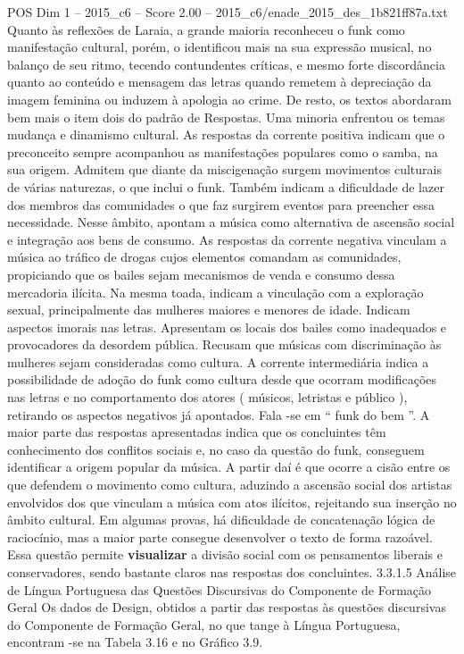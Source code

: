 \begin{textsample}{POS Dim 1 – 2015\_c6 – Score 2.00 – 2015\_c6/enade\_2015\_des\_1b821ff87a.txt}
Quanto às reflexões de Laraia, a grande maioria reconheceu o funk como manifestação cultural, porém, o identificou mais na sua expressão musical, no balanço de seu ritmo, tecendo contundentes críticas, e mesmo forte discordância quanto ao conteúdo e mensagem das letras quando remetem à depreciação da imagem feminina ou induzem à apologia ao crime.
De resto, os textos abordaram bem mais o item dois do padrão de Respostas.
Uma minoria enfrentou os temas mudança e dinamismo cultural.
As respostas da corrente positiva indicam que o preconceito sempre acompanhou as manifestações populares como o samba, na sua origem.
Admitem que diante da miscigenação surgem movimentos culturais de várias naturezas, o que inclui o funk.
Também indicam a dificuldade de lazer dos membros das comunidades o que faz surgirem eventos para preencher essa necessidade.
Nesse âmbito, apontam a música como alternativa de ascensão social e integração aos bens de consumo.
As respostas da corrente negativa vinculam a música ao tráfico de drogas cujos elementos comandam as comunidades, propiciando que os bailes sejam mecanismos de venda e consumo dessa mercadoria ilícita.
Na mesma toada, indicam a vinculação com a exploração sexual, principalmente das mulheres maiores e menores de idade.
Indicam aspectos imorais nas letras.
Apresentam os locais dos bailes como inadequados e provocadores da desordem pública.
Recusam que músicas com discriminação às mulheres sejam consideradas como cultura.
A corrente intermediária indica a possibilidade de adoção do funk como cultura desde que ocorram modificações nas letras e no comportamento dos atores ( músicos, letristas e público ), retirando os aspectos negativos já apontados.
Fala -se em “ funk do bem ”.
A maior parte das respostas apresentadas indica que os concluintes têm conhecimento dos conflitos sociais e, no caso da questão do funk, conseguem identificar a origem popular da música.
A partir daí é que ocorre a cisão entre os que defendem o movimento como cultura, aduzindo a ascensão social dos artistas envolvidos dos que vinculam a música com atos ilícitos, rejeitando sua inserção no âmbito cultural.
Em algumas provas, há dificuldade de concatenação lógica de raciocínio, mas a maior parte consegue desenvolver o texto de forma razoável.
Essa questão permite \textbf{visualizar} a divisão social com os pensamentos liberais e conservadores, sendo bastante claros nas respostas dos concluintes. 3.3.1.5 Análise de Língua Portuguesa das Questões Discursivas do Componente de Formação Geral Os dados de Design, obtidos a partir das respostas às questões discursivas do Componente de Formação Geral, no que tange à Língua Portuguesa, encontram -se na Tabela 3.16 e no Gráfico 3.9.

\end{textsample}
